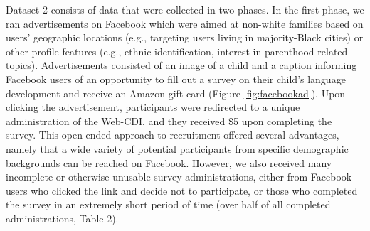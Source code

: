 \documentclass[
  english,
  ,man,floatsintext]{apa6}
\begin{document}
\begin{table}

\caption{\label{tab:unnamed-chunk-14}Exclusions from Dataset 2: recent data collection using Facebook and Prolific.}
\centering
{}
\end{table}

Dataset 2 consists of data that were collected in two phases. In the first phase, we ran advertisements on Facebook which were aimed at non-white families based on users' geographic locations (e.g., targeting users living in majority-Black cities) or other profile features (e.g., ethnic identification, interest in parenthood-related topics). Advertisements consisted of an image of a child and a caption informing Facebook users of an opportunity to fill out a survey on their child's language development and receive an Amazon gift card (Figure \ref{fig:facebookad}). Upon clicking the advertisement, participants were redirected to a unique administration of the Web-CDI, and they received \$5 upon completing the survey. This open-ended approach to recruitment offered several advantages, namely that a wide variety of potential participants from specific demographic backgrounds can be reached on Facebook. However, we also received many incomplete or otherwise unusable survey administrations, either from Facebook users who clicked the link and decide not to participate, or those who completed the survey in an extremely short period of time (over half of all completed administrations, Table 2).
\end{document}
